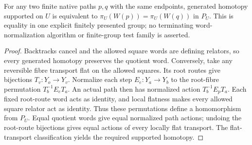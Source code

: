 \begin{lemma}
    \label{lem:peps_dual_finite_presentation_classification}
    \leanok
    For any two finite native paths $p,q$ with the same endpoints,
    generated homotopy supported on $U$ is equivalent to
    $\pi_U(W(p))=\pi_U(W(q))$ in $P_U$.
    This is equality in one explicit finitely presented group; no terminating
    word-normalization algorithm or finite-group test family is asserted.
\end{lemma}
\begin{proof}\leanok
    Backtracks cancel and the allowed square words are defining relators,
    so every generated homotopy preserves the quotient word.
    Conversely, take any reversible fibre transport flat on the allowed
    squares. Its root routes give bijections $T_v:Y_o\to Y_v$.
    Normalize each step $E_e:Y_a\to Y_b$ to the root-fibre permutation
    $T_b^{-1}E_eT_a$. An actual path then has normalized action
    $T_b^{-1}E_pT_a$. Each fixed root-route word acts as identity, and
    local flatness makes every allowed square relator act as identity.
    Thus these permutations define a homomorphism from $P_U$.
    Equal quotient words give equal normalized path actions; undoing the
    root-route bijections gives equal actions of every locally flat transport.
    The flat-transport classification yields the required supported homotopy.
\end{proof}




